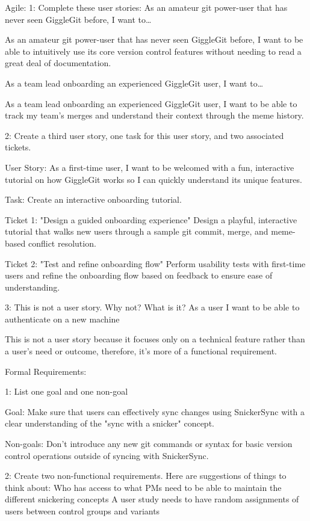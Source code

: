 Agile:
1:
Complete these user stories:
As an amateur git power-user that has never seen GiggleGit before, I want to…

As an amateur git power-user that has never seen GiggleGit before, I want to be able to intuitively use its core version control features without needing to read a great deal of documentation.

As a team lead onboarding an experienced GiggleGit user, I want to…

As a team lead onboarding an experienced GiggleGit user, I want to be able to track my team’s merges and understand their context through the meme history.

2:
Create a third user story, one task for this user story, and two associated tickets.

User Story:
As a first-time user, I want to be welcomed with a fun, interactive tutorial on how GiggleGit works so I can quickly understand its unique features.

Task: Create an interactive onboarding tutorial.

Ticket 1: "Design a guided onboarding experience"
Design a playful, interactive tutorial that walks new users through a sample git commit, merge, and meme-based conflict resolution.

Ticket 2: "Test and refine onboarding flow"
Perform usability tests with first-time users and refine the onboarding flow based on feedback to ensure ease of understanding.

3:
This is not a user story. Why not? What is it?
As a user I want to be able to authenticate on a new machine

This is not a user story because it focuses only on a technical feature rather than a user’s need or outcome, therefore, it's more of a functional requirement. 







Formal Requirements:


1:
List one goal and one non-goal

Goal: Make sure that users can effectively sync changes using SnickerSync with a clear understanding of the "sync with a snicker" concept.

Non-goals: Don’t introduce any new git commands or syntax for basic version control operations outside of syncing with SnickerSync.

2:
Create two non-functional requirements. Here are suggestions of things to think about:
Who has access to what
PMs need to be able to maintain the different snickering concepts
A user study needs to have random assignments of users between control groups and variants

